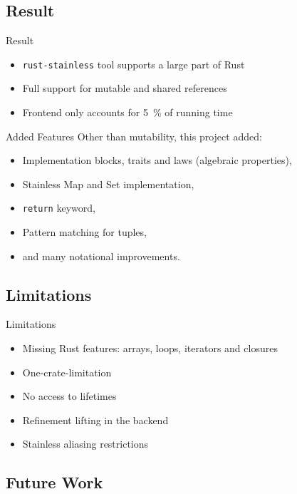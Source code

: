\subsection{Result}

\begin{frame}{Result}
\begin{itemize}
  \item \texttt{rust-stainless} tool supports a large part of Rust
  \item Full support for mutable and shared references
  \item Frontend only accounts for 5~\% of running time
\end{itemize}
\end{frame}

\begin{frame}{Added Features}
Other than mutability, this project added:
\begin{itemize}
\item Implementation blocks, traits and laws (algebraic properties),
\item Stainless Map and Set implementation,
\item \lstinline!return! keyword,
\item Pattern matching for tuples,
\item and many notational improvements.
\end{itemize}
\end{frame}

\subsection{Limitations}

\begin{frame}[fragile]{Limitations}
\begin{itemize}
\item Missing Rust features: arrays, loops, iterators and closures
\item One-crate-limitation
\item No access to lifetimes
\item Refinement lifting in the backend
\item Stainless aliasing restrictions
\end{itemize}
\end{frame}

\subsection{Future Work}

